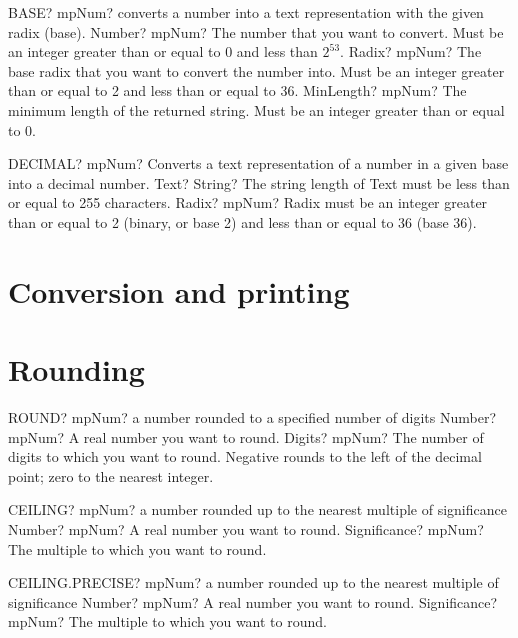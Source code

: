 \documentclass[12pt,a4paper,openany]{book}
\begin{document}
\begin{mpFunctionsExtract}
\mpWorksheetFunctionThree
{BASE? mpNum? converts a number into a text representation with the given radix (base).}
{Number? mpNum? The number that you want to convert. Must be an integer greater than or equal to 0 and less than $2^53$.}
{Radix? mpNum? The base radix that you want to convert the number into. Must be an integer greater than or equal to 2 and less than or equal to 36.}
{MinLength? mpNum? The minimum length of the returned string. Must be an integer greater than or equal to 0.}
\end{mpFunctionsExtract}

\begin{mpFunctionsExtract}
\mpWorksheetFunctionTwoNotImplemented
{DECIMAL? mpNum? Converts a text representation of a number in a given base into a decimal number.}
{Text? String? The string length of Text must be less than or equal to 255 characters.}
{Radix? mpNum? Radix must be an integer greater than or equal to 2 (binary, or base 2) and less than or equal to 36 (base 36).}
\end{mpFunctionsExtract}

\section{Conversion and printing}

\section{Rounding}

\begin{mpFunctionsExtract}
\mpWorksheetFunctionTwoNotImplemented
{ROUND? mpNum? a number rounded to a specified number of digits}
{Number? mpNum? A real number you want to round.}
{Digits? mpNum? The number of digits to which you want to round. Negative rounds to the left of the decimal point; zero to the nearest integer.}
\end{mpFunctionsExtract}

\begin{mpFunctionsExtract}
\mpWorksheetFunctionTwoNotImplemented
{CEILING? mpNum? a number rounded up to the nearest multiple of significance}
{Number? mpNum? A real number you want to round.}
{Significance? mpNum? The multiple to which you want to round.}
\end{mpFunctionsExtract}

\begin{mpFunctionsExtract}
\mpWorksheetFunctionTwoNotImplemented
{CEILING.PRECISE? mpNum? a number rounded up to the nearest multiple of significance}
{Number? mpNum? A real number you want to round.}
{Significance? mpNum? The multiple to which you want to round.}
\end{mpFunctionsExtract}
\end{document}

